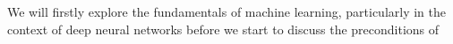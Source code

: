 We will firstly explore the fundamentals of machine learning, particularly in the context of deep neural networks before we start to discuss the preconditions of 